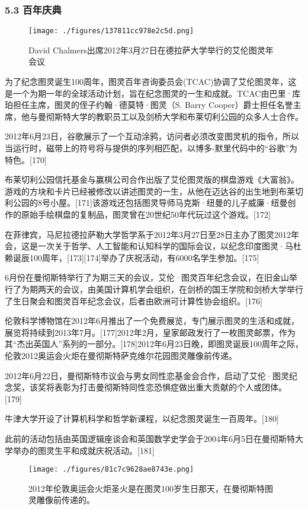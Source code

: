 \subsubsection{5.3 百年庆典}
\begin{figure}[ht]
\centering
\texttt{[image: ./figures/137811cc978e2c5d.png]}
\caption{David Chalmers出席2012年3月27日在德拉萨大学举行的艾伦图灵年会议} \label{fig_ALTL_12}
\end{figure}
为了纪念图灵诞生100周年，图灵百年咨询委员会(TCAC)协调了艾伦图灵年，这是一个为期一年的全球活动计划，旨在纪念图灵的一生和成就。TCAC由巴里·库珀担任主席，图灵的侄子约翰·德莫特·图灵（S. Barry Cooper）爵士担任名誉主席，他与曼彻斯特大学的教职员工以及剑桥大学和布莱切利公园的众多人士合作。

2012年6月23日，谷歌展示了一个互动涂鸦，访问者必须改变图灵机的指令，所以当运行时，磁带上的符号将与提供的序列相匹配，以博多-默里代码中的“谷歌”为特色。[170]

布莱切利公园信托基金与赢棋公司合作出版了艾伦图灵版的棋盘游戏《大富翁》。游戏的方块和卡片已经被修改以讲述图灵的一生，从他在迈达谷的出生地到布莱切利公园的8号小屋。[171]该游戏还包括图灵导师马克斯·纽曼的儿子威廉·纽曼创作的原始手绘棋盘的复制品，图灵曾在20世纪50年代玩过这个游戏。[172]

在菲律宾，马尼拉德拉萨勒大学哲学系于2012年3月27日至28日主办了图灵2012年会，这是一次关于哲学、人工智能和认知科学的国际会议，以纪念印度图灵·马杜赖诞辰100周年，[173][174]举办了庆祝活动，有6000名学生参加。[175]

6月份在曼彻斯特举行了为期三天的会议，艾伦·图灵百年纪念会议，在旧金山举行了为期两天的会议，由美国计算机学会组织，在剑桥的国王学院和剑桥大学举行了生日聚会和图灵百年纪念会议，后者由欧洲可计算性协会组织。[176]

伦敦科学博物馆在2012年6月推出了一个免费展览，专门展示图灵的生活和成就，展览将持续到2013年7月。[177]2012年2月，皇家邮政发行了一枚图灵邮票，作为其“杰出英国人”系列的一部分。[178]2012年6月23日晚，即图灵诞辰100周年之际，伦敦2012奥运会火炬在曼彻斯特萨克维尔花园图灵雕像前传递。

2012年6月22日，曼彻斯特市议会与男女同性恋基金会合作，启动了艾伦·图灵纪念奖，该奖将表彰为打击曼彻斯特同性恋恐惧症做出重大贡献的个人或团体。[179]

牛津大学开设了计算机科学和哲学新课程，以纪念图灵诞生一百周年。[180]

此前的活动包括由英国逻辑座谈会和英国数学史学会于2004年6月5日在曼彻斯特大学举办的图灵生平和成就庆祝活动。[181]
\begin{figure}[ht]
\centering
\texttt{[image: ./figures/81c7c9628ae8743e.png]}
\caption{2012年伦敦奥运会火炬圣火是在图灵100岁生日那天，在曼彻斯特图灵雕像前传递的。} \label{fig_ALTL_13}
\end{figure}
